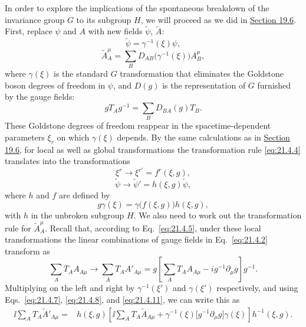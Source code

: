 In order to explore the implications of the spontaneous breakdown of the invariance group $G$ to its subgroup $H$, we will proceed as we did in \hyperref[sec:19.6]{Section 19.6}. First, replace $\psi$ and $A$ with new fields $\widetilde\psi$, $\widetilde A$:
\begin{equation}
\widetilde\psi=\gamma^{-1}(\xi)\psi,
\tag{21.4.6}\label{eq:21.4.6}
\end{equation}
\begin{equation}
\widetilde A_A^\mu
=\sum_B D_{AB}\bigl(\gamma^{-1}(\xi)\bigr)A_B^\mu,
\tag{21.4.7}\label{eq:21.4.7}
\end{equation}
where $\gamma(\xi)$ is the standard $G$ transformation that eliminates the Goldstone boson degrees of freedom in $\psi$, and $D(g)$ is the representation of $G$ furnished by the gauge fields:
\begin{equation}
gT_Ag^{-1}=\sum_B D_{BA}(g)T_B.
\tag{21.4.8}\label{eq:21.4.8}
\end{equation}
These Goldstone degrees of freedom reappear in the spacetime-dependent parameters $\xi_r$ on which $\gamma(\xi)$ depends. By the same calculations as in \hyperref[sec:19.6]{Section 19.6}, for local as well as global transformations the transformation rule \eqref{eq:21.4.4} translates into the transformations
\begin{equation}
\xi^r\longrightarrow\xi^{r\prime}=f^r(\xi,g),
\tag{21.4.9}\label{eq:21.4.9}
\end{equation}
\begin{equation}
\widetilde\psi\longrightarrow\widetilde\psi'
=h(\xi,g)\widetilde\psi,
\tag{21.4.10}\label{eq:21.4.10}
\end{equation}
where $h$ and $f$ are defined by
\begin{equation}
g\gamma(\xi)=\gamma\bigl(f(\xi,g)\bigr)h(\xi,g),
\tag{21.4.11}\label{eq:21.4.11}
\end{equation}
with $h$ in the unbroken subgroup $H$. We also need to work out the transformation rule for $\widetilde A_A^\mu$. Recall that, according to Eq.~\eqref{eq:21.4.5}, under these local transformations the linear combinations of gauge fields in Eq.~\eqref{eq:21.4.2} transform as
\[
\sum_A T_A A_{A\mu}
\longrightarrow
\sum_A T_A A'_{A\mu}
=g\left[\sum_A T_A A_{A\mu}-ig^{-1}\partial_\mu g\right]g^{-1}.
\]
Multiplying on the left and right by $\gamma^{-1}(\xi')$ and $\gamma(\xi')$ respectively, and using Eqs.~\eqref{eq:21.4.7}, \eqref{eq:21.4.8}, and \eqref{eq:21.4.11}, we can write this as
\begin{align}
\ii\sum_A T_A\widetilde A'_{A\mu}
={}&h(\xi,g)
\left[
\ii\sum_A T_A\widetilde A_{A\mu}
+\gamma^{-1}(\xi)\bigl[g^{-1}\partial_\mu g\bigr]\gamma(\xi)
\right]
h^{-1}(\xi,g).
\tag{21.4.12}\label{eq:21.4.12}
\end{align}
